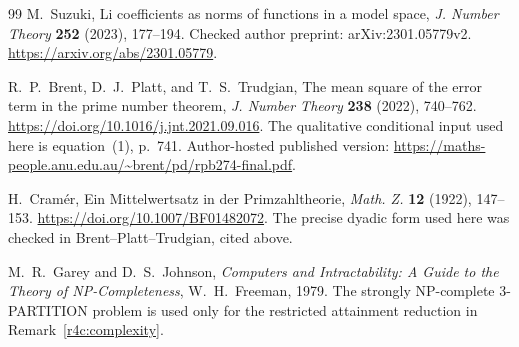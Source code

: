 \documentclass[11pt,a4paper]{article}
\theoremstyle{definition}\newtheorem{definition}[theorem]{Definition}
\theoremstyle{remark}\newtheorem{remark}[theorem]{Remark}
\numberwithin{equation}{section}
\begin{document}
\begin{thebibliography}{99}
M.~Suzuki,
Li coefficients as norms of functions in a model space,
\emph{J. Number Theory} \textbf{252} (2023), 177--194.
Checked author preprint: arXiv:2301.05779v2.
\url{https://arxiv.org/abs/2301.05779}.

R.~P.~Brent, D.~J.~Platt, and T.~S.~Trudgian,
The mean square of the error term in the prime number theorem,
\emph{J. Number Theory} \textbf{238} (2022), 740--762.
\url{https://doi.org/10.1016/j.jnt.2021.09.016}.
The qualitative conditional input used here is equation~(1), p.~741.
Author-hosted published version:
\url{https://maths-people.anu.edu.au/~brent/pd/rpb274-final.pdf}.

H.~Cram\'er,
Ein Mittelwertsatz in der Primzahltheorie,
\emph{Math. Z.} \textbf{12} (1922), 147--153.
\url{https://doi.org/10.1007/BF01482072}.
The precise dyadic form used here was checked in
Brent--Platt--Trudgian, cited above.

M.~R.~Garey and D.~S.~Johnson,
\emph{Computers and Intractability: A Guide to the Theory of
NP-Completeness}, W.~H.~Freeman, 1979. The strongly NP-complete
3-PARTITION problem is used only for the restricted attainment
reduction in Remark~\ref{r4c:complexity}.
\end{thebibliography}
\end{document}
